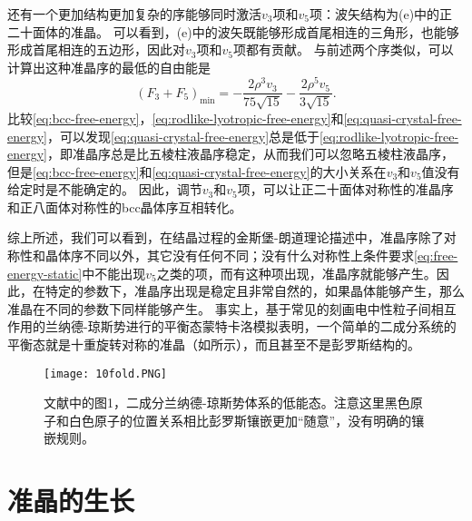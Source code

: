 \documentclass[hyperref, UTF8, a4paper]{ctexart}
\begin{document}
还有一个更加结构更加复杂的序能够同时激活$v_3$项和$v_5$项：波矢结构为(e)中的正二十面体的准晶。
可以看到，(e)中的波矢既能够形成首尾相连的三角形，也能够形成首尾相连的五边形，因此对$v_3$项和$v_5$项都有贡献。
与前述两个序类似，可以计算出这种准晶序的最低的自由能是
\begin{equation}
    \left(F_{3}+F_{5}\right)_{\min }=-\frac{2 \rho^{3} v_{3}}{75 \sqrt{15}}-\frac{2 \rho^{5} v_{5}}{3 \sqrt{15}}.
    \label{eq:quasi-crystal-free-energy}
\end{equation}
比较\eqref{eq:bcc-free-energy}，\eqref{eq:rodlike-lyotropic-free-energy}和\eqref{eq:quasi-crystal-free-energy}，可以发现\eqref{eq:quasi-crystal-free-energy}总是低于\eqref{eq:rodlike-lyotropic-free-energy}，即准晶序总是比五棱柱液晶序稳定，从而我们可以忽略五棱柱液晶序，但是\eqref{eq:bcc-free-energy}和\eqref{eq:quasi-crystal-free-energy}的大小关系在$v_3$和$v_5$值没有给定时是不能确定的。
因此，调节$v_3$和$v_5$项，可以让正二十面体对称性的准晶序和正八面体对称性的bcc晶体序互相转化。

综上所述，我们可以看到，在结晶过程的金斯堡-朗道理论描述中，准晶序除了对称性和晶体序不同以外，其它没有任何不同；没有什么对称性上条件要求\eqref{eq:free-energy-static}中不能出现$v_5$之类的项，而有这种项出现，准晶序就能够产生。因此，在特定的参数下，准晶序出现是稳定且非常自然的，如果晶体能够产生，那么准晶在不同的参数下同样能够产生。
事实上，基于常见的刻画电中性粒子间相互作用的兰纳德-琼斯势进行的平衡态蒙特卡洛模拟表明，一个简单的二成分系统的平衡态就是十重旋转对称的准晶（如所示），而且甚至不是彭罗斯结构的\cite{PhysRevLett.58.706}。

\begin{figure}
    \centering
    \texttt{[image: 10fold.PNG]}
    \caption{文献\cite{PhysRevLett.58.706}中的图1，二成分兰纳德-琼斯势体系的低能态。注意这里黑色原子和白色原子的位置关系相比彭罗斯镶嵌更加“随意”，没有明确的镶嵌规则。}
    \label{fig:10fold}
\end{figure}

\section{准晶的生长}\label{sec:growth}
\end{document}
